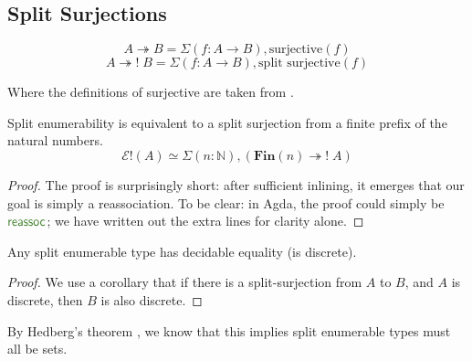 \subsection{Split Surjections}
\begin{rm-definition}[Surjections]
  \begin{multicols}{2}
    \begin{equation}
      A \twoheadrightarrow B = \Sigma (f : A \rightarrow B) , \text{surjective}(f)
    \end{equation} \break
    \begin{equation}
      A \twoheadrightarrow! \; B = \Sigma (f : A \rightarrow B) , \text{split surjective}(f)
    \end{equation}
  \end{multicols}
  Where the definitions of surjective are taken from \cite[definition
  4.6.1]{hottbook}.
\end{rm-definition}
\begin{rm-theorem} \label{split-enum-surj}
  Split enumerability is equivalent to a split surjection from a finite prefix
  of the natural numbers.
  \begin{equation}
    \mathcal{E}!(A) \simeq \Sigma {(n : \mathbb{N})} , \left( \mathbf{Fin}(n) \twoheadrightarrow ! \; A \right)
  \end{equation}
\end{rm-theorem}
\begin{proof}
  The proof is surprisingly short: after sufficient inlining, it emerges that
  our goal is simply a reassociation.
  To be clear: in Agda, the proof could simply be \(\AgdaFunction{reassoc}\); we
  have written out the extra lines for clarity alone.
\end{proof}

\begin{rm-lemma} \label{split-enum-discrete}
  Any split enumerable type has decidable equality (is discrete).
\end{rm-lemma}
\begin{proof}
  We use a corollary that if there is a split-surjection from \(A\) to \(B\),
  and \(A\) is discrete, then \(B\) is also discrete.
\end{proof}
By Hedberg's theorem \cite{hedbergCoherenceTheoremMartinLof1998}, we know that
this implies split enumerable types must all be sets.
